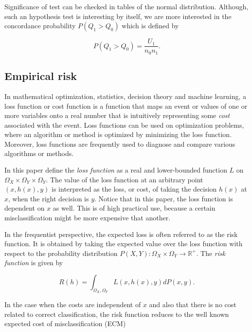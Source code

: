 \documentclass{article}
\theoremstyle{theorem}
\theoremstyle{definition}
\begin{document}
Significance of test can be checked in tables of the normal distribution.  Although, such an hypothesis test is interesting by itself, we are more interested in the concordance probability $P(Q_1 > Q_0)$ which is defined by

\begin{equation}
\label{eq:concordance}
P(Q_1 > Q_0) = \frac{U_1}{n_0n_1}.
\end{equation}


\subsection{Empirical risk}
\label{sec:empRisk}

In mathematical optimization, statistics, decision theory and machine learning, a loss function or cost function is a function that maps an event or values of one or more variables onto a real number that is intuitively representing some \emph{cost} associated with the event. Loss functions can be used on optimization problems, where an algorithm or method is optimized by minimizing the loss function.  Moreover, loss functions are frequently used to diagnose and compare various algorithms or methods.  

In this paper define the \emph{loss function} as a real and lower-bounded function $L$ on $\Omega_X \times \Omega_Y \times \Omega_Y$.  The value of the loss function at an arbitrary point $(x, h(x), y)$ is interpreted as the loss, or cost, of taking the decision $h(x)$ at $x$, when the right decision is $y$.  Notice that in this paper, the loss function is dependent on $x$ as well.  This is of high practical use, because a certain misclassification might be more expensive that another. 

In the frequentist perspective, the expected loss is often referred to as the risk function.  It is obtained by taking the expected value over the loss function with respect to the probability distribution $P(X,Y): \Omega_X\times \Omega_Y \rightarrow \mathbb{R}^+$.  The \emph{risk function} is given by

\begin{equation}
\label{def:risk}
R(h) = \int_{\Omega_X,\Omega_Y} L(x,h(x),y) dP(x,y).
\end{equation}

In the case when the costs are independent of $x$ and also that there is no cost related to correct classification, the risk function reduces to the well known expected cost of misclassification (ECM)
\end{document}
